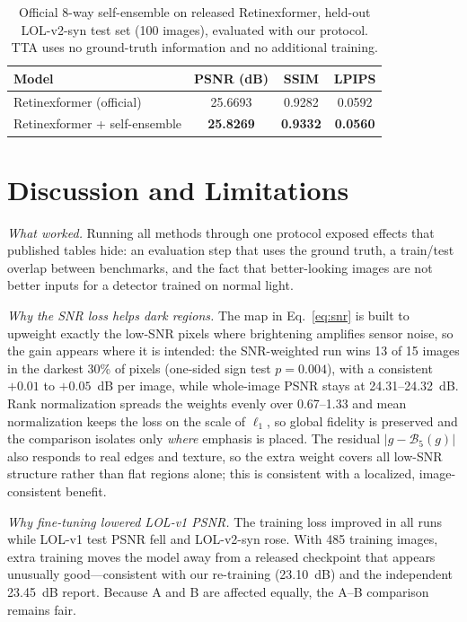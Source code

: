 \documentclass[journal]{IEEEtran}
\begin{document}
\begin{table}[t]
\centering
\caption{Official 8-way self-ensemble on released Retinexformer, held-out LOL-v2-syn test set (100 images), evaluated
with our protocol. TTA uses no ground-truth information and no additional training.}
\label{tab:tta}
\begin{tabular}{l c c c}
\toprule
Model & PSNR (dB) & SSIM & LPIPS \\
\midrule
Retinexformer (official)      & 25.6693 & 0.9282 & 0.0592 \\
Retinexformer + self-ensemble & \textbf{25.8269} & \textbf{0.9332} & \textbf{0.0560} \\
\bottomrule
\end{tabular}
\end{table}

\section{Discussion and Limitations}\label{sec:discussion}
\emph{What worked.} Running all methods through one protocol exposed effects that published tables hide: an evaluation
step that uses the ground truth, a train/test overlap between benchmarks, and the fact that better-looking images are
not better inputs for a detector trained on normal light.

\emph{Why the SNR loss helps dark regions.} The map in Eq.~\eqref{eq:snr} is built to upweight exactly the low-SNR
pixels where brightening amplifies sensor noise, so the gain appears where it is intended: the SNR-weighted run wins
13 of 15 images in the darkest 30\% of pixels (one-sided sign test $p=0.004$), with a consistent $+0.01$ to $+0.05$~dB
per image, while whole-image PSNR stays at 24.31--24.32~dB. Rank normalization spreads the weights evenly over
0.67--1.33 and mean normalization keeps the loss on the scale of $\ell_1$, so global fidelity is preserved and the
comparison isolates only \emph{where} emphasis is placed. The residual $|g-\mathcal{B}_5(g)|$ also responds to real
edges and texture, so the extra weight covers all low-SNR structure rather than flat regions alone; this is consistent
with a localized, image-consistent benefit.

\emph{Why fine-tuning lowered LOL-v1 PSNR.} The training loss improved in all runs while LOL-v1 test PSNR fell and
LOL-v2-syn rose. With 485 training images, extra training moves the model away from a released checkpoint that appears
unusually good---consistent with our re-training (23.10~dB) and the independent 23.45~dB report. Because A and B are
affected equally, the A--B comparison remains fair.
\end{document}
